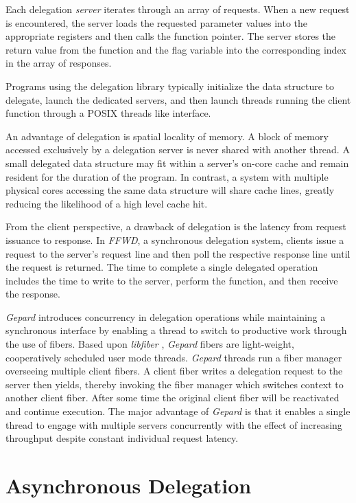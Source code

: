 \documentclass{uicthesi}
\begin{document}
Each delegation \textit{server} iterates through an array of requests. When a new request is encountered, the server loads the requested parameter values into the appropriate registers and then calls the function pointer. The server stores the return value from the function and the flag variable into the corresponding index in the array of responses.  

Programs using the delegation library typically initialize the data structure to delegate, launch the dedicated servers, and then launch threads running the client function through a POSIX threads like interface. 

An advantage of delegation is spatial locality of memory. A block of memory accessed exclusively by a delegation server is never shared with another thread. A small delegated data structure may fit within a server's on-core cache and remain resident for the duration of the program. In contrast, a system with multiple physical cores accessing the same data structure will share cache lines, greatly reducing the likelihood of a high level cache hit. 

From the client perspective, a drawback of delegation is the latency from request issuance to response. In \textit{FFWD}, a synchronous delegation system, clients issue a request to the server's request line and then poll the respective response line until the request is returned. The time to complete a single delegated operation includes the time to write to the server, perform the function, and then receive the response. 

\textit{Gepard} introduces concurrency in delegation operations while maintaining a synchronous interface by enabling a thread to switch to productive work through the use of fibers. Based upon \textit{libfiber} \cite{libfiber}, \textit{Gepard} fibers are light-weight, cooperatively scheduled user mode threads. \textit{Gepard} threads run a fiber manager overseeing multiple client fibers. A client fiber writes a delegation request to the server then yields, thereby invoking the fiber manager which switches context to another client fiber. After some time the original client fiber will be reactivated and continue execution. The major advantage of \textit{Gepard} is that it enables a single thread to engage with multiple servers concurrently with the effect of increasing throughput despite constant individual request latency. 

\chapter{Asynchronous Delegation}
\end{document}
